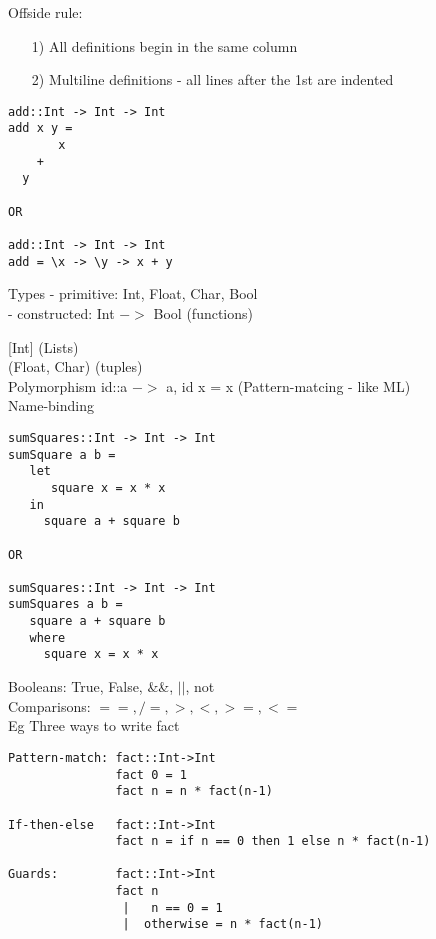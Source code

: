 \documentclass[11pt]{article}
\begin{document}
Offside rule:
\begin{itemize}
	\item[1)] All definitions begin in the same column
	\item[2)] Multiline definitions - all lines after the 1st are indented
\end{itemize}

\begin{verbatim}
add::Int -> Int -> Int
add x y = 
       x
    +
  y
  
OR

add::Int -> Int -> Int
add = \x -> \y -> x + y
\end{verbatim}

Types - primitive: Int, Float, Char, Bool \\

- constructed: Int $->$ Bool (functions)

[Int] (Lists) \\

(Float, Char) (tuples) \\

Polymorphism id::a $->$ a, id x = x (Pattern-matcing - like ML) \\

Name-binding 
\begin{verbatim}
sumSquares::Int -> Int -> Int
sumSquare a b = 
   let
      square x = x * x
   in
     square a + square b

OR

sumSquares::Int -> Int -> Int
sumSquares a b =
   square a + square b
   where
     square x = x * x
\end{verbatim}

Booleans: True, False, \&\&, $||$, not \\

Comparisons: $==, /=, >, <, >=, <=$ \\

Eg Three ways to write fact \\

\begin{verbatim}
Pattern-match: fact::Int->Int
               fact 0 = 1
               fact n = n * fact(n-1)

If-then-else   fact::Int->Int
               fact n = if n == 0 then 1 else n * fact(n-1)

Guards:        fact::Int->Int
               fact n
                |   n == 0 = 1
                |  otherwise = n * fact(n-1)
\end{verbatim}
\end{document}
